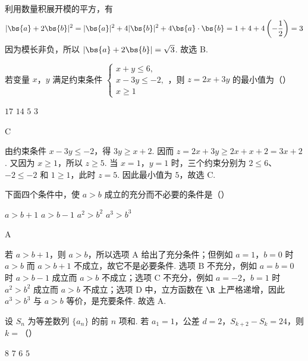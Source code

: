 \begin{solution}
利用数量积展开模的平方，有
\[
|\bs{a}+2\bs{b}|^2=|\bs{a}|^2+4|\bs{b}|^2+4\bs{a}\cdot\bs{b}=1+4+4\left(-\frac{1}{2}\right)=3
\]
因为模长非负，所以 \(|\bs{a}+2\bs{b}|=\sqrt{3}\). 故选 B.
\end{solution}

\begin{problem}
若变量 \(x\)，\(y\) 满足约束条件
\(\begin{cases}
x+y\leqslant6,\\
x-3y\leqslant-2,\\
x\geqslant1
\end{cases}\)，则 \(z=2x+3y\) 的最小值为（\quad）

\choices
    {\(17\)}
    {\(14\)}
    {\(5\)}
    {\(3\)}
\end{problem}

\begin{answer}
C
\end{answer}

\begin{solution}
由约束条件 \(x-3y\leqslant-2\)，得 \(3y\geqslant x+2\). 因而 \(z=2x+3y\geqslant2x+x+2=3x+2\). 又因为 \(x\geqslant1\)，所以 \(z\geqslant5\). 当 \(x=1\)，\(y=1\) 时，三个约束分别为 \(2\leqslant6\)、\(-2\leqslant-2\) 和 \(1\geqslant1\)，此时 \(z=5\). 因此最小值为 \(5\)，故选 C.
\end{solution}

\begin{problem}
下面四个条件中，使 \(a>b\) 成立的充分而不必要的条件是（\quad）

\choices
    {\(a>b+1\)}
    {\(a>b-1\)}
    {\(a^2>b^2\)}
    {\(a^3>b^3\)}
\end{problem}

\begin{answer}
A
\end{answer}

\begin{solution}
若 \(a>b+1\)，则 \(a>b\)，所以选项 A 给出了充分条件；但例如 \(a=1\)，\(b=0\) 时 \(a>b\) 而 \(a>b+1\) 不成立，故它不是必要条件. 选项 B 不充分，例如 \(a=b=0\) 时 \(a>b-1\) 成立而 \(a>b\) 不成立；选项 C 不充分，例如 \(a=-2\)，\(b=1\) 时 \(a^2>b^2\) 成立而 \(a>b\) 不成立；选项 D 中，立方函数在 \(\R\) 上严格递增，因此 \(a^3>b^3\) 与 \(a>b\) 等价，是充要条件. 故选 A.
\end{solution}

\begin{problem}
设 \(S_n\) 为等差数列 \(\{a_n\}\) 的前 \(n\) 项和. 若 \(a_1=1\)，公差 \(d=2\)，\(S_{k+2}-S_k=24\)，则 \(k=\)（\quad）

\choices
    {\(8\)}
    {\(7\)}
    {\(6\)}
    {\(5\)}
\end{problem}

